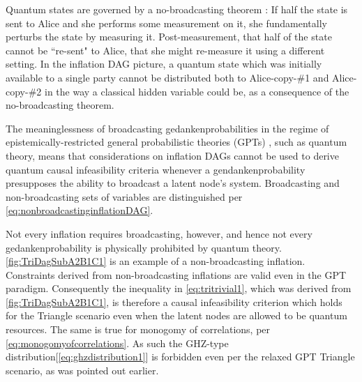 Quantum states are governed by a no-broadcasting theorem \cite{NoCloningQuantum1996,NoCloningGeneral2006}: If half the state is sent to Alice and she performs some measurement on it, she fundamentally perturbs the state by measuring it. Post-measurement, that half of the state cannot be ``re-sent" to Alice, that she might re-measure it using a different setting. In the inflation DAG picture, a quantum state which was initially available to a single party cannot be distributed both to Alice-copy-\#1 and Alice-copy-\#2 in the way a classical hidden variable could be, as a consequence of the no-broadcasting theorem. 

The meaninglessness of broadcasting gedankenprobabilities in the regime of epistemically-restricted general probabilistic theories (GPTs) \cite{SpekkensToyTheory,NoCloningGeneral2006,Barnum2012GPT,Janotta2014GPT}, such as quantum theory, means that considerations on inflation DAGs cannot be used to derive quantum causal infeasibility criteria whenever a gendankenprobability presupposes the ability to broadcast a latent node's system. Broadcasting and non-broadcasting sets of variables are distinguished per \cref{eq:nonbroadcastinginflationDAG}.


Not every inflation requires broadcasting, however, and hence not every gedankenprobability is physically prohibited by quantum theory. 
\cref{fig:TriDagSubA2B1C1} is an example of a non-broadcasting inflation.
Constraints derived from non-broadcasting inflations are valid even in the GPT paradigm. Consequently the inequality in \cref{eq:tritrivial1}, which was derived from \cref{fig:TriDagSubA2B1C1}, is therefore a causal infeasibility criterion which holds for the Triangle scenario even when the latent nodes are allowed to be quantum resources. The same is true for monogomy of correlations, per \cref{eq:monogomyofcorrelations}. As such the GHZ-type distribution[\cref{eq:ghzdistribution1}] is forbidden even per the relaxed GPT Triangle scenario, as was pointed out earlier. 

